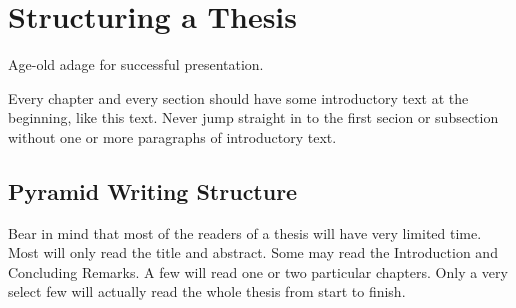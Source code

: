 %
%
% 
% 
% 


\chapter{Structuring a Thesis}

\label{chap:Struc}

{
Age-old adage for successful presentation.
}




Every chapter and every section should have some introductory text at
the beginning, like this text. Never jump straight in to the first
secion or subsection without one or more paragraphs of introductory
text.




\section{Pyramid Writing Structure}

Bear in mind that most of the readers of a thesis will have very
limited time. Most will only read the title and abstract. Some may
read the Introduction and Concluding Remarks. A few will read one or
two particular chapters. Only a very select few will actually read the
whole thesis from start to finish.


